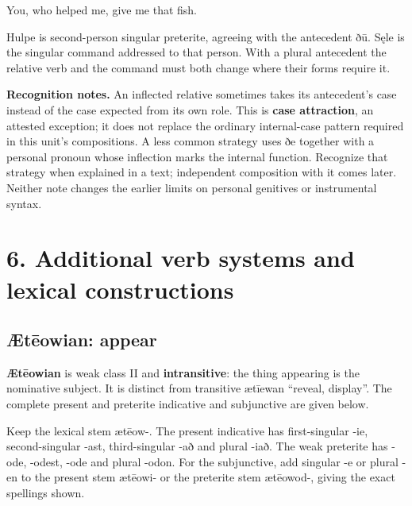 You, who helped me, give me that fish.

Hulpe is second-person singular preterite, agreeing with the antecedent ðū. Sęle is the singular command addressed to that person. With a plural antecedent the relative verb and the command must both change where their forms require it.

\textbf{Recognition notes.} An inflected relative sometimes takes its antecedent’s case instead of the case expected from its own role. This is \textbf{case attraction}, an attested exception; it does not replace the ordinary internal-case pattern required in this unit’s compositions. A less common strategy uses ðe together with a personal pronoun whose inflection marks the internal function. Recognize that strategy when explained in a text; independent composition with it comes later. Neither note changes the earlier limits on personal genitives or instrumental syntax.

\section*{6. Additional verb systems and lexical constructions}

\subsection*{Ætēowian: appear}

\textbf{Ætēowian} is weak class II and \textbf{intransitive}: the thing appearing is the nominative subject. It is distinct from transitive ætīewan “reveal, display”. The complete present and preterite indicative and subjunctive are given below.

Keep the lexical stem ætēow-. The present indicative has first-singular -ie, second-singular -ast, third-singular -að and plural -iað. The weak preterite has -ode, -odest, -ode and plural -odon. For the subjunctive, add singular -e or plural -en to the present stem ætēowi- or the preterite stem ætēowod-, giving the exact spellings shown.

